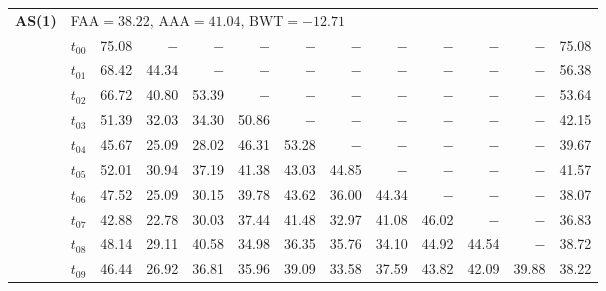 \begin{table}[ht]
\begin{tabular}{@{}l l r r r r r r r r r r r@{}}
\midrule
\multirow{11}{*}{\textbf{AS(1)}} & \multicolumn{12}{l}{\quad\small FAA$=38.22$,\; AAA$=41.04$,\; BWT$=-12.71$} \\
 & $t_{00}$ & 75.08 & $-$ & $-$ & $-$ & $-$ & $-$ & $-$ & $-$ & $-$ & $-$ & 75.08 \\
 & $t_{01}$ & 68.42 & 44.34 & $-$ & $-$ & $-$ & $-$ & $-$ & $-$ & $-$ & $-$ & 56.38 \\
 & $t_{02}$ & 66.72 & 40.80 & 53.39 & $-$ & $-$ & $-$ & $-$ & $-$ & $-$ & $-$ & 53.64 \\
 & $t_{03}$ & 51.39 & 32.03 & 34.30 & 50.86 & $-$ & $-$ & $-$ & $-$ & $-$ & $-$ & 42.15 \\
 & $t_{04}$ & 45.67 & 25.09 & 28.02 & 46.31 & 53.28 & $-$ & $-$ & $-$ & $-$ & $-$ & 39.67 \\
 & $t_{05}$ & 52.01 & 30.94 & 37.19 & 41.38 & 43.03 & 44.85 & $-$ & $-$ & $-$ & $-$ & 41.57 \\
 & $t_{06}$ & 47.52 & 25.09 & 30.15 & 39.78 & 43.62 & 36.00 & 44.34 & $-$ & $-$ & $-$ & 38.07 \\
 & $t_{07}$ & 42.88 & 22.78 & 30.03 & 37.44 & 41.48 & 32.97 & 41.08 & 46.02 & $-$ & $-$ & 36.83 \\
 & $t_{08}$ & 48.14 & 29.11 & 40.58 & 34.98 & 36.35 & 35.76 & 34.10 & 44.92 & 44.54 & $-$ & 38.72 \\
 & $t_{09}$ & 46.44 & 26.92 & 36.81 & 35.96 & 39.09 & 33.58 & 37.59 & 43.82 & 42.09 & 39.88 & 38.22 \\
\bottomrule
\end{tabular}
\end{table}
